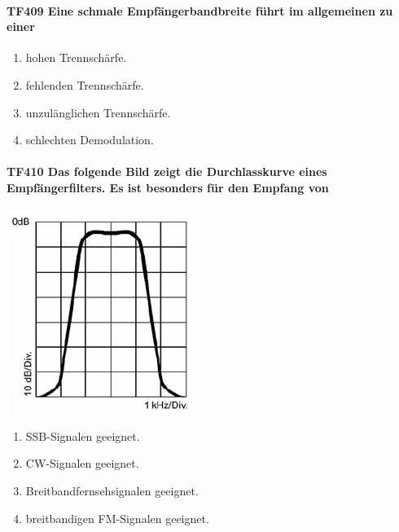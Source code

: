 \documentclass[8pt]{article}
\begin{document}
\paragraph*{TF409 Eine schmale Empfängerbandbreite führt im allgemeinen zu einer} 
\begin{enumerate}[nolistsep,label=\Alph*]
\item hohen Trennschärfe.
\item fehlenden Trennschärfe.
\item unzulänglichen Trennschärfe.
\item schlechten Demodulation.
\end{enumerate}

\paragraph*{TF410 Das folgende Bild zeigt die Durchlasskurve eines Empfängerfilters. Es ist besonders für den Empfang von}
\begin{center}
	\begin{minipage}{\linewidth}
		\centering
		\includegraphics[scale=1.0]{pics/tf410_a.jpg}
	\end{minipage}
\end{center}
\begin{enumerate}[nolistsep,label=\Alph*]
\item SSB-Signalen geeignet.
\item CW-Signalen geeignet.
\item Breitbandfernsehsignalen geeignet.
\item breitbandigen FM-Signalen geeignet.
\end{enumerate}
\end{document}
